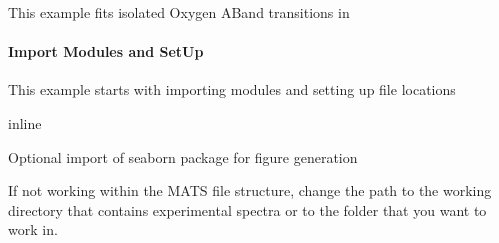 \documentclass[letterpaper,10pt,english]{sphinxmanual}
\begin{document}
\sphinxAtStartPar
This example fits isolated Oxygen A\sphinxhyphen{}Band transitions in 


\paragraph{Import Modules and Set\sphinxhyphen{}Up}
\label{\detokenize{Fitting Experimental Spectra:import-modules-and-set-up}}
\sphinxAtStartPar
This example starts with importing modules and setting up file locations

\begin{sphinxVerbatim}[commandchars=\\\{\}]
   
   
  
   
   
 inline
 
\end{sphinxVerbatim}

\sphinxAtStartPar
Optional import of seaborn package for figure generation

\begin{sphinxVerbatim}[commandchars=\\\{\}]
   
\end{sphinxVerbatim}

\sphinxAtStartPar
If not working within the MATS file structure, change the path to the working directory that contains experimental spectra or to the folder that you want to work in.

\begin{sphinxVerbatim}[commandchars=\\\{\}]
\end{sphinxVerbatim}
\end{document}
